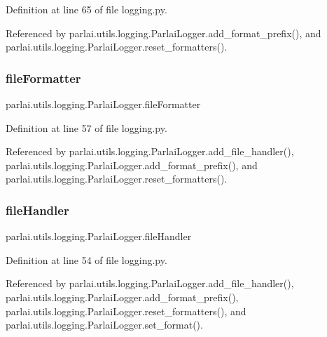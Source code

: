 Definition at line 65 of file logging.\+py.



Referenced by parlai.\+utils.\+logging.\+Parlai\+Logger.\+add\+\_\+format\+\_\+prefix(), and parlai.\+utils.\+logging.\+Parlai\+Logger.\+reset\+\_\+formatters().

\mbox{\label{classparlai_1_1utils_1_1logging_1_1ParlaiLogger_ae795816c275c3f3756f72d542a965748}} 
\subsubsection{\texorpdfstring{file\+Formatter}{fileFormatter}}
{\footnotesize\ttfamily parlai.\+utils.\+logging.\+Parlai\+Logger.\+file\+Formatter}



Definition at line 57 of file logging.\+py.



Referenced by parlai.\+utils.\+logging.\+Parlai\+Logger.\+add\+\_\+file\+\_\+handler(), parlai.\+utils.\+logging.\+Parlai\+Logger.\+add\+\_\+format\+\_\+prefix(), and parlai.\+utils.\+logging.\+Parlai\+Logger.\+reset\+\_\+formatters().

\mbox{\label{classparlai_1_1utils_1_1logging_1_1ParlaiLogger_a50c9155a1b765f79e15d64090ad0a236}} 
\subsubsection{\texorpdfstring{file\+Handler}{fileHandler}}
{\footnotesize\ttfamily parlai.\+utils.\+logging.\+Parlai\+Logger.\+file\+Handler}



Definition at line 54 of file logging.\+py.



Referenced by parlai.\+utils.\+logging.\+Parlai\+Logger.\+add\+\_\+file\+\_\+handler(), parlai.\+utils.\+logging.\+Parlai\+Logger.\+add\+\_\+format\+\_\+prefix(), parlai.\+utils.\+logging.\+Parlai\+Logger.\+reset\+\_\+formatters(), and parlai.\+utils.\+logging.\+Parlai\+Logger.\+set\+\_\+format().

